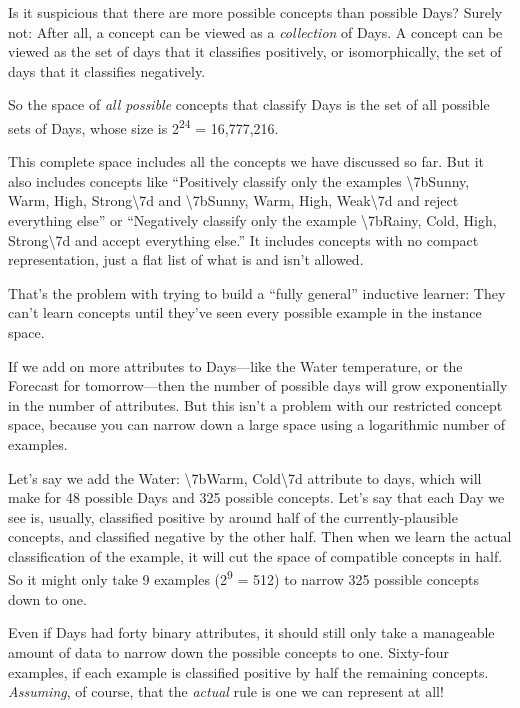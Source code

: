 {
 Is it suspicious that there are more possible concepts than
possible Days? Surely not: After all, a concept can be viewed as a
\textit{collection} of Days. A concept can be viewed as the set of days
that it classifies positively, or isomorphically, the set of days that
it classifies negatively.}

{
 So the space of \textit{all possible} concepts that classify Days
is the set of all possible sets of Days, whose size is
2\textsuperscript{24} = 16,777,216.}

{
 This complete space includes all the concepts we have discussed so
far. But it also includes concepts like ``Positively
classify only the examples {\textbackslash}{\textquotesingle}7bSunny,
Warm, High, Strong{\textbackslash}{\textquotesingle}7d and
{\textbackslash}{\textquotesingle}7bSunny, Warm, High,
Weak{\textbackslash}{\textquotesingle}7d and reject everything
else'' or ``Negatively classify only
the example {\textbackslash}{\textquotesingle}7bRainy, Cold, High,
Strong{\textbackslash}{\textquotesingle}7d and accept everything
else.'' It includes concepts with no compact
representation, just a flat list of what is and isn't
allowed.}

{
 That's the problem with trying to build a
``fully general'' inductive learner:
They can't learn concepts until they've
seen every possible example in the instance space.}

{
 If we add on more attributes to Days---like the Water temperature,
or the Forecast for tomorrow---then the number of possible days will
grow exponentially in the number of attributes. But this
isn't a problem with our restricted concept space,
because you can narrow down a large space using a logarithmic number of
examples.}

{
 Let's say we add the Water:
{\textbackslash}{\textquotesingle}7bWarm,
Cold{\textbackslash}{\textquotesingle}7d attribute to days, which will
make for 48 possible Days and 325 possible concepts.
Let's say that each Day we see is, usually, classified
positive by around half of the currently-plausible concepts, and
classified negative by the other half. Then when we learn the actual
classification of the example, it will cut the space of compatible
concepts in half. So it might only take 9 examples
(2\textsuperscript{9} = 512) to narrow 325 possible concepts down to
one.}

{
 Even if Days had forty binary attributes, it should still only
take a manageable amount of data to narrow down the possible concepts
to one. Sixty-four examples, if each example is classified positive by
half the remaining concepts. \textit{Assuming}, of course, that the
\textit{actual} rule is one we can represent at all!}

